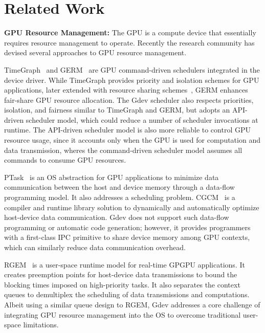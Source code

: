 \vspace{-0.25em}
\section{Related Work}
\label{sec:related_work}
\vspace{-0.25em}

\textbf{GPU Resource Management:}
The GPU is a compute device that essentially requires resource management
to operate.
Recently the research community has devised several approaches to GPU
resource management.

TimeGraph~\cite{Kato_ATC11} and GERM~\cite{Bautin_MCNC08} are GPU
command-driven schedulers integrated in the device driver.
While TimeGraph provides priority and isolation schemes for
GPU applications, later extended with resource sharing
schemes~\cite{Kato_RTAS11}, GERM enhances fair-share GPU resource
allocation.
The Gdev scheduler also respects priorities, isolation, and fairness
similar to TimeGraph and GERM, but adopts an API-driven scheduler model,
which could reduce a number of scheduler invocations at runtime.
The API-driven scheduler model is also more reliable to control GPU
resource usage, since it accounts only when the GPU is used
for computation and data transmission, wheres the command-driven
scheduler model assumes all commands to consume GPU resources.

PTask~\cite{Rossbach_SOSP11} is an OS abstraction for GPU applications
to minimize data communication between the host and device memory
through a data-flow programming model.
It also addresses a scheduling problem.
CGCM~\cite{Jablin_PLDI11} is a compiler and runtime library solution to
dynamically and automatically optimize host-device data communication.
Gdev does not support such data-flow programming or automatic code
generation; however, it provides programmers with a first-class IPC
primitive to share device memory among GPU contexts, which can similarly
reduce data communication overhead.

RGEM~\cite{Kato_RTSS11} is a user-space runtime model for real-time
GPGPU applications.
It creates preemption points for host-device data transmissions to bound
the blocking times imposed on high-priority tasks.
It also separates the context queues to demultiplex the scheduling of
data transmissions and computations.
Albeit using a similar queue design to RGEM, Gdev addresses a core
challenge of integrating GPU resource management into the OS to overcome
traditional user-space limitations.

